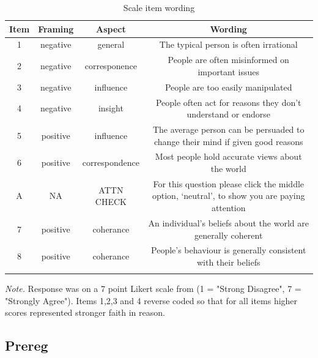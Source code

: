 \documentclass[
  ,jou,floatsintext]{apa6}
\begin{document}
\begin{table}[tbp]

\begin{center}
\begin{threeparttable}

\caption{\label{tab:items}Scale item wording}

\begin{tabular}{cccc}
\toprule
Item & \multicolumn{1}{c}{Framing} & \multicolumn{1}{c}{Aspect} & \multicolumn{1}{c}{Wording}\\
\midrule
1 & negative & general & The typical person is often irrational\\
2 & negative & corresponence & People are often misinformed on important issues\\
3 & negative & influence & People are too easily manipulated\\
4 & negative & insight & People often act for reasons they don’t understand or endorse\\
5 & positive & influence & The average person can be persuaded to change their mind if given good reasons\\
6 & positive & correspondence & Most people hold accurate views about the world\\
A & NA & ATTN CHECK & For this question please click the middle option, ‘neutral’, to show you are paying attention\\
7 & positive & coherance & An individual's beliefs about the world are generally coherent\\
8 & positive & coherance & People's behaviour is generally consistent with their beliefs\\
\bottomrule
\addlinespace
\end{tabular}

\begin{tablenotes}[para]
\normalsize{\textit{Note.} Response was on a 7 point Likert scale from (1 = "Strong Disagree", 7 = "Strongly Agree"). Items 1,2,3 and 4 reverse coded so that for all items higher scores represented stronger faith in reason.}
\end{tablenotes}

\end{threeparttable}
\end{center}

\end{table}

\hypertarget{prereg}{%
\subsection{Prereg}\label{prereg}}
\end{document}
